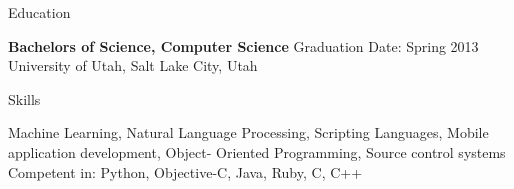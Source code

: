 \documentclass{resume}
\begin{document}
\begin{rSection}{Education}

{\bf Bachelors of Science, Computer Science} \hfill {Graduation Date: Spring 2013} \\ 
University of Utah, Salt Lake City, Utah

\end{rSection}


\begin{rSection}{Skills}

Machine Learning, Natural Language Processing, Scripting Languages, Mobile application development, Object- Oriented Programming, Source control systems \\
Competent in: Python, Objective-C, Java, Ruby, C, C++

\end{rSection}

\end{document}
